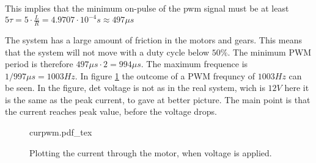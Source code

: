 \documentclass[../../../Main]{subfiles}
\begin{document}
This implies that the minimum on-pulse of the pwm signal must be at least $5\tau = 5 \cdot \frac{L}{R} = 4.9707 \cdot 10^{-4}s \approx 497\mu s$

The system has a large amount of friction in the motors and gears. This means that the system will not move with a duty cycle below $50\%$. The minimum PWM period is therefore $497\mu s \cdot 2 = 994\mu s$. The maximum frequence is $1/997\mu s = 1003 Hz$.
In figure \ref{fig:currentplot_pwm} the outcome of a PWM frequncy of $1003Hz$ can be seen.
In the figure, det voltage is not as in the real system, wich is $12V$ here it is the same as the peak current, to gave at better picture. The main point is that the current reaches peak value, before the voltage drops. 

\begin{figure}[H]
\centering
\def\svgwidth{\textwidth}
{curpwm.pdf_tex}
\caption{Plotting the current through the motor, when voltage is applied.}
\label{fig:currentplot_pwm}
\end{figure}
\end{document}
